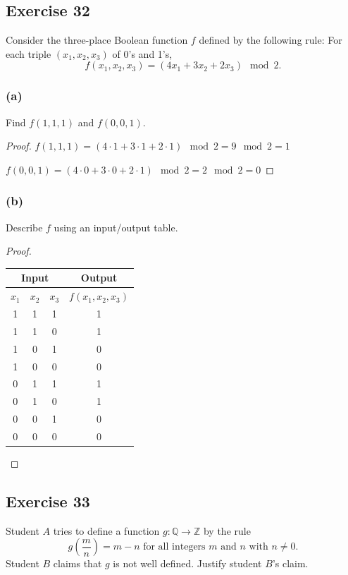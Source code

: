 \documentclass[14pt]{extarticle}
\newcommand{\Q}{\mathbb{Q}}
\newcommand{\Z}{\mathbb{Z}}
\newcommand{\cy}{\color{cyan}}
\begin{document}
\subsection{Exercise 32}
Consider the three-place Boolean function $f$ defined by the following rule: For each triple \((x_1, x_2, x_3)\) of
0’s and 1’s,
\[
f(x_1, x_2, x_3) = (4x_1 + 3x_2 + 2x_3) \mod 2.
\]
\subsubsection{(a)}
Find $f(1, 1, 1)$ and $f(0, 0, 1)$.

\begin{proof}
\(f(1, 1, 1) = (4 \cdot 1 + 3 \cdot 1 + 2 \cdot 1) \mod 2 = 9 \mod 2 = 1\)

\(f(0, 0, 1) = (4 \cdot 0 + 3 \cdot 0 + 2 \cdot 1) \mod 2 = 2 \mod 2 = 0\)
\end{proof}

\subsubsection{(b)}
Describe $f$ using an input/output table.

\begin{proof}
\begin{center}
\begin{tabular}{|ccc|c|}
\hline
\multicolumn{3}{|c|}{\cy Input} & {\cy Output} \\
\hline
$x_1$ & $x_2$ & $x_3$ & $f(x_1, x_2, x_3)$ \\
\hline
1 & 1 & 1 & 1 \\
\hline
1 & 1 & 0 & 1 \\
\hline
1 & 0 & 1 & 0 \\
\hline
1 & 0 & 0 & 0 \\
\hline
0 & 1 & 1 & 1 \\
\hline
0 & 1 & 0 & 1 \\
\hline
0 & 0 & 1 & 0 \\
\hline
0 & 0 & 0 & 0 \\
\hline
\end{tabular}
\end{center}
\end{proof}

\subsection{Exercise 33}
Student $A$ tries to define a function \(g: \Q \to \Z\) by
the rule
\[
g \left(\frac{m}{n}\right) = m-n \text{ for all integers } m \text{ and } n \text{ with } n \neq 0.
\]
Student $B$ claims that $g$ is not well defined. Justify student $B$'s claim.
\end{document}
